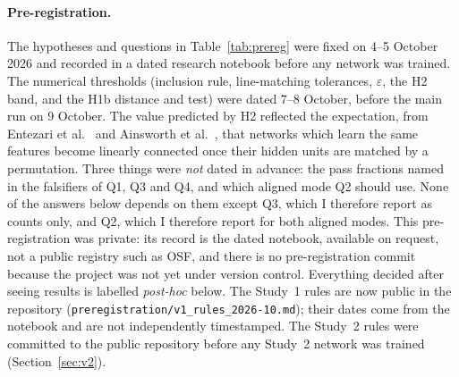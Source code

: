\documentclass[11pt]{article}
\newcommand{\eps}{\varepsilon}
\begin{document}
\paragraph{Pre-registration.} The hypotheses and questions in Table~\ref{tab:prereg} were fixed on 4--5 October 2026 and recorded in a dated research notebook before any network was trained. The numerical thresholds (inclusion rule, line-matching tolerances, $\eps$, the H2 band, and the H1b distance and test) were dated 7--8 October, before the main run on 9 October. The value predicted by H2 reflected the expectation, from Entezari et al.~\cite{entezari2022role} and Ainsworth et al.~\cite{ainsworth2023git}, that networks which learn the same features become linearly connected once their hidden units are matched by a permutation. Three things were \emph{not} dated in advance: the pass fractions named in the falsifiers of Q1, Q3 and Q4, and which aligned mode Q2 should use. None of the answers below depends on them except Q3, which I therefore report as counts only, and Q2, which I therefore report for both aligned modes. This pre-registration was private: its record is the dated notebook, available on request, not a public registry such as OSF, and there is no pre-registration commit because the project was not yet under version control. Everything decided after seeing results is labelled \emph{post-hoc} below. The Study~1 rules are now public in the repository (\texttt{preregistration/v1\_rules\_2026-10.md}); their dates come from the notebook and are not independently timestamped. The Study~2 rules were committed to the public repository before any Study~2 network was trained (Section~\ref{sec:v2}).
\end{document}
